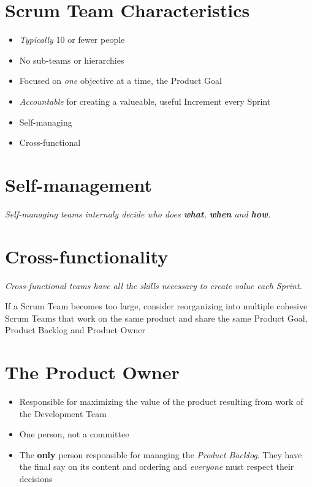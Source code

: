 \documentclass[a4paper,11pt,twocolumn]{article}
\begin{document}
\section*{Scrum Team Characteristics}
\begin{itemize}
	\item \textit{Typically} 10 or fewer people
	\item No sub-teams or hierarchies
	\item Focused on \textit{one} objective at a time, the Product Goal
	\item \textit{Accountable} for creating a valueable, useful Increment every Sprint
	\item Self-managing
	\item Cross-functional
\end{itemize}

\section*{Self-management}
\textit{Self-managing teams internaly decide who does \textbf{what}, \textbf{when} and \textbf{how}.}

\section*{Cross-functionality}
\textit{Cross-functional teams have all the skills necessary to create value each Sprint.}

\hspace{0.5pt}

\begin{tcolorbox}[colback=black!8!white,colframe=gray!50!black,title=Note,sharp corners,fonttitle=\normalsize\bfseries,fontupper=\normalsize,left=0.7em,right=0.7em]
	If a Scrum Team becomes too large, consider reorganizing into multiple cohesive Scrum Teams that work on the same product and share the same Product Goal, Product Backlog and Product Owner
\end{tcolorbox}

\section*{The Product Owner}
\begin{itemize}
    \item Responsible for maximizing the value of the product resulting from work of the Development Team
	\item One person, not a committee
    \item The \textbf{only} person responsible for managing the \textit{Product Backlog}. They have the final say on its content and ordering and \textit{everyone} must respect their decisions
\end{itemize}
\end{document}
